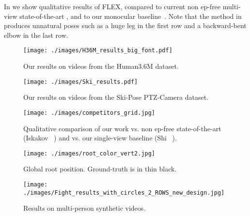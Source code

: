 In  we show qualitative results of FLEX, compared to current non ep-free  multi-view state-of-the-art \cite{iskakov2019learnable}, and to our monocular baseline~\cite{shi2020motionet}. 
Note that the method in \cite{iskakov2019learnable} produces unnatural poses such as a huge leg in the first row and a backward-bent elbow in the last row. 

\begin{figure}[t]
\setlength{\abovecaptionskip}{5pt plus 3pt minus 2pt}
\setlength{\belowcaptionskip}{-5pt plus 3pt minus 2pt}
\centering
\begin{minipage}[b]{0.48\linewidth}
    \centering
\texttt{[image: ./images/H36M\_results\_big\_font.pdf]}
    \caption{Our results on videos from the Human3.6M dataset.}
    \label{fig:quality_h36}
\end{minipage}
\hfill
\begin{minipage}[b]{0.48\linewidth}
    \centering
    \texttt{[image: ./images/Ski\_results.pdf]}
    \caption{Our results on videos from the Ski-Pose PTZ-Camera dataset.}
    \label{fig:ski_ptz_qualitative}
\end{minipage}
\end{figure}

 \begin{figure}[t]
\setlength{\abovecaptionskip}{5pt plus 3pt minus 2pt}
\setlength{\belowcaptionskip}{-15pt plus 3pt minus 2pt}
\centering
\begin{minipage}[b]{0.68\linewidth}
    \centering
    \texttt{[image: ./images/competitors\_grid.jpg]}
    \caption{Qualitative comparison of our work vs. non ep-free state-of-the-art (Iskakov \etal~\cite{iskakov2019learnable}) and vs. our single-view baseline (Shi \etal~\cite{shi2020motionet}).}
    \label{fig:competitors}
\end{minipage}
\hfill
\begin{minipage}[b]{0.27\linewidth}
    \centering
\texttt{[image: ./images/root\_color\_vert2.jpg]}
    \caption{Global root position. Ground-truth is in thin black.}
    \label{fig:root_pos}
\end{minipage}
\end{figure}

 \begin{figure*}[htb]
\setlength{\abovecaptionskip}{5pt plus 3pt minus 2pt}
\setlength{\belowcaptionskip}{-15pt plus 3pt minus 2pt}
\centering
\texttt{[image: ./images/Fight\_results\_with\_circles\_2\_ROWS\_new\_design.jpg]}
\caption{Results on multi-person synthetic videos.
} 
\label{fig:fight_results_with_circles}
\end{figure*} 

